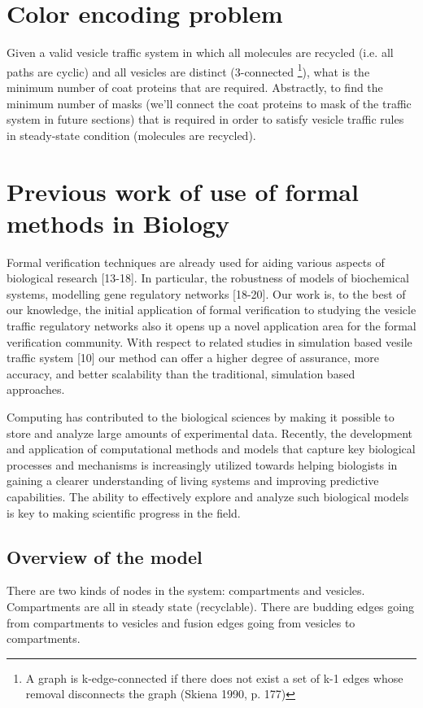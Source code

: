 \documentclass[preprint,12pt]{elsarticle}
\begin{document}
\section{Color encoding problem}
Given a valid vesicle traffic system in which all molecules are recycled (i.e. all paths are cyclic) and all vesicles are distinct (3-connected \footnote{A graph is k-edge-connected if there does not exist a set of k-1 edges whose removal disconnects the graph (Skiena 1990, p. 177)}), what is the minimum number of coat proteins that are required. Abstractly, to find the minimum number of masks (we'll connect the coat proteins to mask of the traffic system in future sections) that is required in order to satisfy vesicle traffic rules in steady-state condition (molecules are recycled). 

\section{Previous work of use of formal methods in Biology}

Formal verification techniques are already used for aiding various
aspects of biological research [13-18]. In particular, the robustness of models of biochemical systems, modelling gene regulatory networks [18-20]. Our work is, to the best of our knowledge, the initial application of formal verification to studying the vesicle traffic regulatory networks also it opens up a novel application area for the formal verification community. With respect to related studies in simulation based vesile traffic system [10] our method can offer a higher degree of assurance, more accuracy, and better scalability than the traditional, simulation based approaches. 

Computing has contributed to the biological sciences by making it possible to store and analyze large amounts of experimental data. Recently, the development and application of computational methods and models that capture key biological processes and mechanisms is increasingly utilized towards helping biologists in gaining a clearer understanding of living systems and improving predictive capabilities. The ability to effectively explore and analyze such biological models is key to making scientific progress in the field.

\subsection{Overview of the model} There are two kinds of nodes in the system: compartments and vesicles. Compartments are all in steady state (recyclable). There are budding edges going from compartments to vesicles and fusion edges going from vesicles to compartments.
\end{document}
